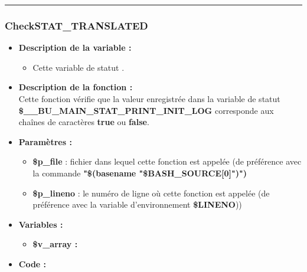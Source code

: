 \documentclass[a4paper,10pt]{article}
\begin{document}
\color{blue}\par\noindent\rule{\textwidth}{0.4pt}\color{white}

\color{blue}
\subsubsection{CheckSTAT\_TRANSLATED}\color{white}

\begin{itemize}
    \item \textbf{Description de la variable :}
    \begin{itemize}
        \item Cette variable de statut .\\[1\baselineskip]
    \end{itemize}


    \item \textbf{Description de la fonction :}\\
        Cette fonction vérifie que la valeur enregistrée dans la variable de statut \textbf{\color{orange}\$\_\_BU\_MAIN\_STAT\_PRINT\_INIT\_LOG} corresponde aux chaînes de caractères \textbf{true} ou \textbf{false}.\\[1\baselineskip]

    \item \textbf{Paramètres :}
    \begin{itemize}
        \item \color{orange}\textbf{\$p\_file}\color{white} : fichier dans lequel cette fonction est appelée (de préférence avec la commande \textbf{"\$(\color{gray}basename \color{white}"\color{orange}\$BASH\_SOURCE[0]\color{white}")")}\\[1\baselineskip]

        \item \color{orange}\textbf{\$p\_lineno}\color{white} : le numéro de ligne où cette fonction est appelée (de préférence avec la variable d'environnement \textbf{\color{orange}\$LINENO}))\\[1\baselineskip]
    \end{itemize}

    \item \textbf{Variables :}
    \begin{itemize}
        \item \textbf{\color{orange}\$v\_array\color{white} :}\\[1\baselineskip]
    \end{itemize}


    \item \textbf{Code :}
\end{itemize}
\end{document}
